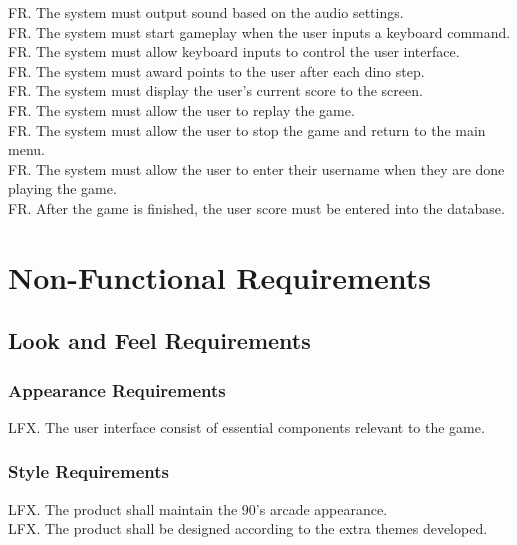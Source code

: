 \documentclass{article}
\begin{document}
FR. The system must output sound based on the audio settings. \\

FR. The system must start gameplay when the user inputs a keyboard command. \\

FR. The system must allow keyboard inputs to control the user interface. \\

FR. The system must award points to the user after each dino step. \\

FR. The system must display the user’s current score to the screen. \\

FR. The system must allow the user to replay the game. \\

FR. The system must allow the user to stop the game and return to the main menu. \\

FR. The system must allow the user to enter their username when they are done playing the game. \\

FR. After the game is finished, the user score must be entered into the database. \\




\section{Non-Functional Requirements}
    \subsection{Look and Feel Requirements}
        \subsubsection{Appearance Requirements}
        LFX. The user interface consist of essential components relevant to the game.
        \subsubsection{Style Requirements} 
    	LFX. The product shall maintain the 90's arcade appearance.\\
    	LFX. The product shall be designed according to the extra themes developed.
   
\end{document}
